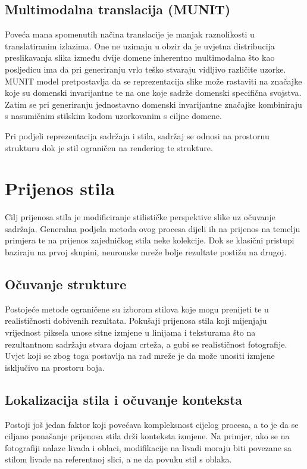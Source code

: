 \documentclass[lmodern, utf8, seminar]{fer}
\begin{document}
\section{Multimodalna translacija (MUNIT)}
Poveća mana spomenutih načina translacije je manjak raznolikosti u translatiranim izlazima. One ne uzimaju u obzir da je uvjetna distribucija preslikavanja slika između dvije domene inherentno multimodalna \cite{huang2018multimodal} što kao posljedicu ima da pri generiranju vrlo teško stvaraju vidljivo različite uzorke. MUNIT model pretpostavlja da se reprezentacija slike može rastaviti na značajke koje su domenski invarijantne te na one koje sadrže domenski specifična svojstva. Zatim se pri generiranju jednostavno domenski invarijantne značajke kombiniraju s nasumičnim stilskim kodom uzorkovanim s ciljne domene.
\newline

Pri podjeli reprezentacija sadržaja i stila, sadržaj se odnosi na prostornu strukturu dok je stil ograničen na rendering te strukture.


\chapter{Prijenos stila}
Cilj prijenosa stila je modificiranje stilističke perspektive slike uz očuvanje sadržaja. Generalna podjela metoda ovog procesa dijeli ih na prijenos na temelju primjera te na prijenos zajedničkog stila neke kolekcije. Dok se klasični pristupi baziraju na prvoj skupini, neuronske mreže bolje rezultate postižu na drugoj.

\section{Očuvanje strukture}
Postojeće metode ograničene su izborom stilova koje mogu prenijeti te u realističnosti dobivenih rezultata. Pokušaji prijenosa stila koji mijenjaju vrijednost piksela unose sitne izmjene u linijama i teksturama što na rezultantnom sadržaju stvara dojam crteža, a gubi se realističnost fotografije. Uvjet koji se zbog toga postavlja na rad mreže je da može unositi izmjene isključivo na prostoru boja.

\section{Lokalizacija stila i očuvanje konteksta} \cite{luan2017deep}
Postoji još jedan faktor koji povećava kompleksnost cijelog procesa, a to je da se ciljano ponašanje prijenosa stila drži konteksta izmjene. Na primjer, ako se na fotografiji nalaze livada i oblaci, modifikacije na livadi moraju biti povezane sa stilom livade na referentnoj slici, a ne da povuku stil s oblaka. 
\end{document}

